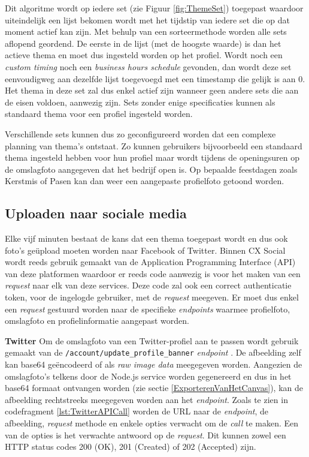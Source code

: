 Dit algoritme wordt op iedere set (zie Figuur \ref{fig:ThemeSet}) toegepast waardoor uiteindelijk een lijst bekomen wordt met het tijdstip van iedere set die op dat moment actief kan zijn. Met behulp van een sorteermethode worden alle sets aflopend geordend. De eerste in de lijst (met de hoogste waarde) %
is dan het actieve thema en moet dus ingesteld worden op het profiel. Wordt noch een \textit{custom timing} noch een \textit{business hours schedule} gevonden, dan wordt deze set eenvoudigweg aan dezelfde lijst toegevoegd met een timestamp die gelijk is aan 0. Het thema in deze set zal dus enkel actief zijn wanneer geen andere sets die aan de eisen voldoen, aanwezig zijn. Sets zonder enige specificaties kunnen als standaard thema voor een profiel ingesteld worden. 

Verschillende sets kunnen dus zo geconfigureerd worden dat een complexe planning van thema's ontstaat. Zo kunnen gebruikers bijvoorbeeld een standaard thema ingesteld hebben voor hun profiel maar wordt tijdens de openingsuren op de omslagfoto aangegeven dat het bedrijf open is. Op bepaalde feestdagen zoals Kerstmis of Pasen kan dan weer een aangepaste profielfoto getoond worden. 

\subsection{Uploaden naar sociale media}
Elke vijf minuten bestaat de kans dat een thema toegepast wordt en dus ook foto's ge\"{u}pload moeten worden naar Facebook of Twitter. Binnen CX Social wordt reeds gebruik gemaakt van de Application Programming Interface (API) van deze platformen waardoor er reeds code aanwezig is voor het maken van een \textit{request} naar elk van deze services. Deze code zal ook een correct authenticatie token, voor de ingelogde gebruiker, met de \textit{request} meegeven. %
Er moet dus enkel een \textit{request} gestuurd worden naar de specifieke \textit{endpoints} waarmee profielfoto, omslagfoto en profielinformatie aangepast worden. 

\textbf{Twitter} \break
Om de omslagfoto van een Twitter-profiel aan te passen wordt gebruik gemaakt van de \texttt{/account/update{\_}profile{\_}banner} \textit{endpoint} \cite{TwitterAPIDoc}. De afbeelding zelf kan base64 ge\"{e}ncodeerd of als \textit{raw image data} meegegeven worden. Aangezien de omslagfoto's telkens door de Node.js service worden gegenereerd en dus in het base64 formaat ontvangen worden (zie sectie \ref{ExporterenVanHetCanvas}), kan de afbeelding rechtstreeks meegegeven worden aan het \textit{endpoint}. Zoals te zien in codefragment \ref{lst:TwitterAPICall} worden de URL naar de \textit{endpoint}, de afbeelding, \textit{request} methode en enkele opties verwacht om de \textit{call} te maken. Een van de opties is het verwachte antwoord op de \textit{request}. Dit kunnen zowel een HTTP status codes 200 (OK), 201 (Created) of 202 (Accepted) zijn. 

